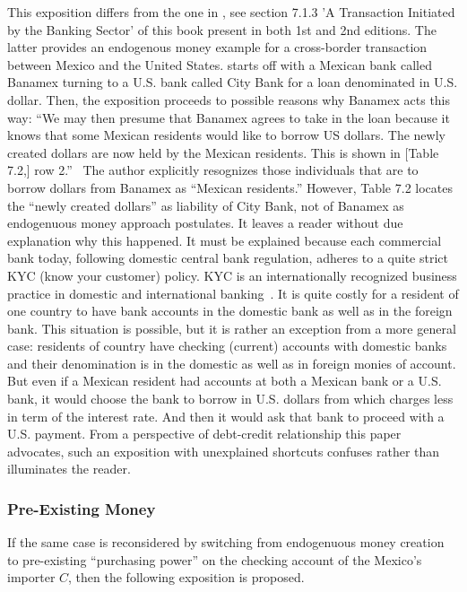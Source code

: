 This exposition differs from the one in \cite{lavoie2014,lavoie2022}, see section 7.1.3 'A Transaction Initiated by the Banking Sector' of this book present in both 1st and 2nd editions. The latter provides an endogenous money example for a cross-border transaction between Mexico and the United States. \citeauthor{lavoie2022} starts off with a Mexican bank called Banamex turning to a U.S. bank called City Bank for a loan denominated in U.S. dollar. Then, the exposition proceeds to possible reasons why Banamex acts this way:  ``We may then presume that Banamex agrees to take in the loan because it knows that some Mexican residents would like to borrow US dollars. The newly created dollars are now held by the Mexican residents. This is shown in [Table 7.2,] row 2.''~\citep[p.~501]{lavoie2022} The author explicitly resognizes those individuals that are to borrow dollars from Banamex as ``Mexican residents.'' However, Table 7.2 locates the ``newly created dollars'' as liability of City Bank, not of Banamex as endogenuous money approach postulates. It leaves a reader without due explanation why this happened. It must be explained because each commercial bank today, following domestic central bank regulation, adheres to a quite strict KYC (know your customer) policy. KYC is an internationally recognized business practice in domestic and international banking~\citep{bis2020_}. It is quite costly for a resident of one country to have bank accounts in the domestic bank as well as in the foreign bank. This situation is possible, but it is rather an exception from a more general case: residents of country have checking (current) accounts with domestic banks and their denomination is in the domestic as well as in foreign monies of account. But even if a Mexican resident had accounts at both a Mexican bank or a U.S. bank, it would choose the bank to borrow in U.S. dollars from which charges less in term of the interest rate. And then it would ask that bank to proceed with a U.S. payment. From a perspective of debt-credit relationship this paper advocates, such an exposition with unexplained shortcuts confuses rather than illuminates the reader.

\subsubsection{Pre-Existing Money}

If the same case is reconsidered by switching from endogenuous money creation to pre-existing ``purchasing power'' on the checking account of the Mexico's importer $C$, then the following exposition is proposed. 

